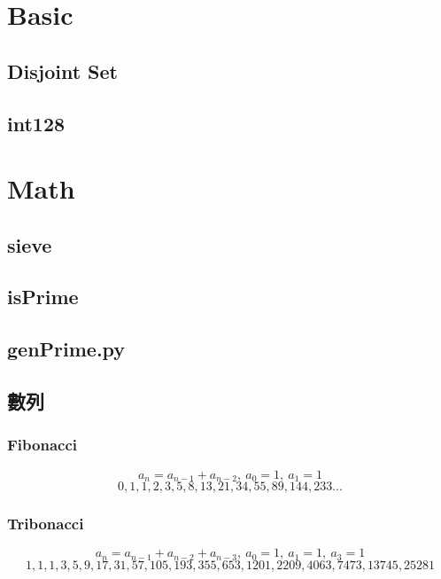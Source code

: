 

\section{Basic}

\subsection{Disjoint Set}


\subsection{int128}


\section{Math}

\subsection{sieve}


\subsection{isPrime}


\subsection{genPrime.py}


\subsection{數列}
\subsubsection{Fibonacci}
\[a_{n} = a_{n-1} + a_{n-2},\ a_0 = 1,\ a_1 = 1\]
\[0, 1, 1, 2, 3, 5, 8, 13, 21, 34, 55, 89, 144, 233...\]

\subsubsection{Tribonacci}
\[a_{n} = a_{n-1} + a_{n-2} + a_{n-3},\ a_0 = 1,\ a_1 = 1,\ a_3 = 1\]
\[1, 1, 1, 3, 5, 9, 17, 31, 57, 105, 193, 355, 653, 1201, 2209, 4063, 7473, 13745, 25281\]

